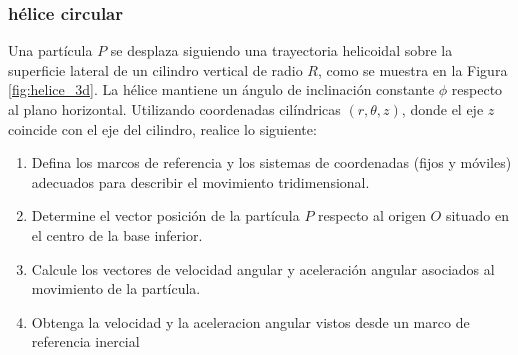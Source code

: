 \subsubsection{hélice circular}

Una partícula $P$ se desplaza siguiendo una trayectoria helicoidal sobre la superficie lateral de un cilindro vertical de radio $R$, como se muestra en la Figura \ref{fig:helice_3d}. La hélice mantiene un ángulo de inclinación constante $\phi$ respecto al plano horizontal. Utilizando coordenadas cilíndricas $(r, \theta, z)$, donde el eje $z$ coincide con el eje del cilindro, realice lo siguiente:

\begin{enumerate}
    \item Defina los marcos de referencia y los sistemas de coordenadas (fijos y móviles) adecuados para describir el movimiento tridimensional.
    \item Determine el vector posición de la partícula $P$ respecto al origen $O$ situado en el centro de la base inferior.
    \item Calcule los vectores de velocidad angular y aceleración angular asociados al movimiento de la partícula.
    \item Obtenga la velocidad y la aceleracion angular vistos desde un marco de referencia inercial
\end{enumerate}

